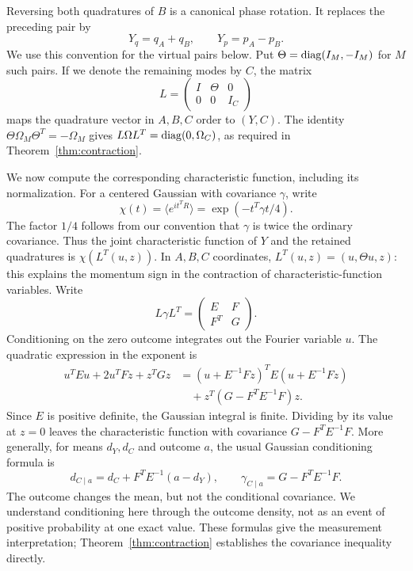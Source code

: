 Reversing both quadratures of $B$ is a canonical phase rotation. It replaces the
preceding pair by
\begin{equation}\label{eq:epr-plus}
 Y_q=q_A+q_B,\qquad Y_p=p_A-p_B.
\end{equation}
We use this convention for the virtual pairs below. Put
$\Theta=\operatorname{diag}(I_M,-I_M)$ for $M$ such pairs. If we denote the remaining modes
by $C$, the matrix
\[
 L=\begin{pmatrix}I&\Theta&0\\0&0&I_C\end{pmatrix}
\]
maps the quadrature vector in $A,B,C$ order to $(Y,C)$.
The identity $\Theta\Omega_M\Theta^T=-\Omega_M$ gives
$L\Omega L^T=\operatorname{diag}(0,\Omega_C)$, as required in Theorem~\ref{thm:contraction}.

We now compute the corresponding characteristic function, including its
normalization. For a centered Gaussian with covariance $\gamma$, write
\[
 \chi(t)=\langle e^{it^TR}\rangle=\exp(-t^T\gamma t/4).
\]
The factor $1/4$ follows from our convention that $\gamma$ is twice the ordinary
covariance. Thus the joint characteristic function of $Y$ and the retained
quadratures is $\chi(L^T(u,z))$. In $A,B,C$ coordinates,
$L^T(u,z)=(u,\Theta u,z)$: this explains the momentum sign in the contraction
of characteristic-function variables. Write
\[
 L\gamma L^T=\begin{pmatrix}E&F\\F^T&G\end{pmatrix}.
\]
Conditioning on the zero outcome integrates out the Fourier variable $u$.
The quadratic expression in the exponent is
\begin{align*}
 u^TEu+2u^TFz+z^TGz
 &=(u+E^{-1}Fz)^TE(u+E^{-1}Fz)\\
 &\quad+z^T(G-F^TE^{-1}F)z.
\end{align*}
Since $E$ is positive definite, the Gaussian integral is finite. Dividing by
its value at $z=0$ leaves the characteristic function with covariance
$G-F^TE^{-1}F$. More generally, for means $d_Y,d_C$ and outcome $a$, the usual
Gaussian conditioning formula is
\begin{equation}\label{eq:conditional-mean}
 d_{C\mid a}=d_C+F^TE^{-1}(a-d_Y),\qquad
 \gamma_{C\mid a}=G-F^TE^{-1}F.
\end{equation}
The outcome changes the mean, but not the conditional covariance. We understand
conditioning here through the outcome density, not as an event of positive
probability at one exact value. These formulas give the measurement interpretation;
Theorem~\ref{thm:contraction} establishes the covariance inequality directly.

